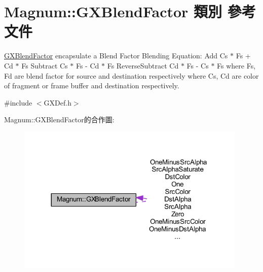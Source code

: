 \hypertarget{class_magnum_1_1_g_x_blend_factor}{}\section{Magnum\+:\+:G\+X\+Blend\+Factor 類別 參考文件}
\label{class_magnum_1_1_g_x_blend_factor}


\hyperlink{class_magnum_1_1_g_x_blend_factor}{G\+X\+Blend\+Factor} encapsulate a Blend Factor Blending Equation\+: Add Cs $\ast$ Fs + Cd $\ast$ Fs Subtract Cs $\ast$ Fs -\/ Cd $\ast$ Fs Reverse\+Subtract Cd $\ast$ Fs -\/ Cs $\ast$ Fs where Fs, Fd are blend factor for source and destination respectively where Cs, Cd are color of fragment or frame buffer and destination respectively.  




{\ttfamily \#include $<$G\+X\+Def.\+h$>$}



Magnum\+:\+:G\+X\+Blend\+Factor的合作圖\+:\nopagebreak
\begin{figure}[H]
\begin{center}
\leavevmode
\includegraphics[width=311pt]{class_magnum_1_1_g_x_blend_factor__coll__graph}
\end{center}
\end{figure}

